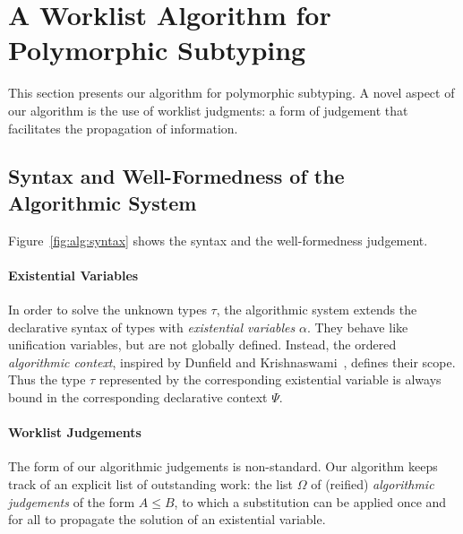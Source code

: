 \section{A Worklist Algorithm for Polymorphic Subtyping}\label{algorithmic_subtyping}

This section presents our algorithm for polymorphic
subtyping. A novel aspect of our algorithm is the use of worklist
judgments: a form of judgement that facilitates the propagation 
of information. 


\subsection{Syntax and Well-Formedness of the Algorithmic System}
Figure~\ref{fig:alg:syntax} shows the
syntax and the well-formedness judgement.  

\paragraph{Existential Variables}
In order to solve the unknown types $\tau$, the algorithmic system extends the
declarative syntax of types with \emph{existential variables} $\alpha$.  They
behave like unification variables, but are not globally defined. Instead, the
ordered \emph{algorithmic context}, inspired by Dunfield and
Krishnaswami~\cite{dunfield2013complete}, defines their scope. Thus 
the type $\tau$ represented by the corresponding existential variable is
always bound in the corresponding declarative context $\Psi$.

\paragraph{Worklist Judgements} The form of our algorithmic judgements is
non-standard. 
Our algorithm keeps track of an explicit list of
outstanding work: the list $\Omega$ of (reified) \emph{algorithmic judgements} 
of the form $A \leq B$,
to which a substitution can be applied once and for all to propagate the solution
of an existential variable. 

